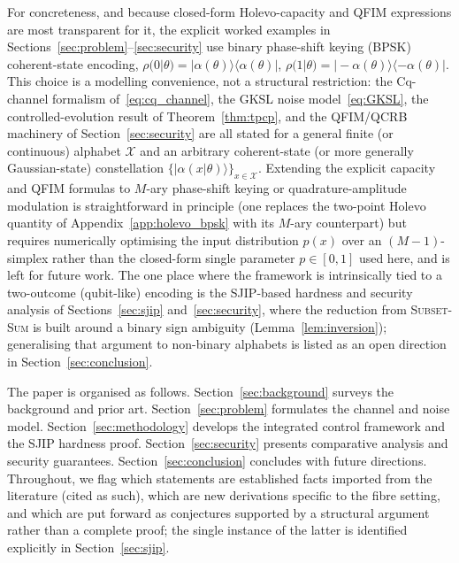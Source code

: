 \documentclass[journal,twocolumn]{IEEEtran}
\theoremstyle{definition}
\theoremstyle{plain}
\begin{document}
For concreteness, and because closed-form Holevo-capacity and QFIM
expressions are most transparent for it, the explicit worked
examples in Sections~\ref{sec:problem}--\ref{sec:security} use
binary phase-shift keying (BPSK) coherent-state encoding,
$\rho(0|\theta)=|\alpha(\theta)\rangle\langle\alpha(\theta)|$,
$\rho(1|\theta)=|-\alpha(\theta)\rangle\langle-\alpha(\theta)|$. This
choice is a modelling convenience, not a structural restriction: the
Cq-channel formalism of~\eqref{eq:cq_channel}, the GKSL noise
model~\eqref{eq:GKSL}, the controlled-evolution result of
Theorem~\ref{thm:tpcp}, and the QFIM/QCRB machinery of
Section~\ref{sec:security} are all stated for a general finite (or
continuous) alphabet $\mathcal{X}$ and an arbitrary coherent-state (or
more generally Gaussian-state) constellation $\{|\alpha(x|\theta)\rangle\}_{x\in\mathcal X}$.
Extending the explicit capacity and QFIM formulas to $M$-ary
phase-shift keying or quadrature-amplitude modulation is
straightforward in principle (one replaces the two-point Holevo
quantity of Appendix~\ref{app:holevo_bpsk} with its $M$-ary
counterpart) but requires numerically optimising the input
distribution $p(x)$ over an $(M-1)$-simplex rather than the closed-form
single parameter $p\in[0,1]$ used here, and is left for future work.
The one place where the framework is intrinsically tied to a
two-outcome (qubit-like) encoding is the SJIP-based hardness and
security analysis of Sections~\ref{sec:sjip} and~\ref{sec:security},
where the reduction from \textsc{Subset-Sum} is built around a
binary sign ambiguity (Lemma~\ref{lem:inversion}); generalising that
argument to non-binary alphabets is listed as an open direction in
Section~\ref{sec:conclusion}.

The paper is organised as follows.  Section~\ref{sec:background}
surveys the background and prior art.  Section~\ref{sec:problem}
formulates the channel and noise model.
Section~\ref{sec:methodology} develops the integrated control
framework and the SJIP hardness proof.
Section~\ref{sec:security} presents comparative analysis and
security guarantees.  Section~\ref{sec:conclusion} concludes with
future directions. Throughout, we flag which statements are
established facts imported from the literature (cited as such),
which are new derivations specific to the fibre setting, and which
are put forward as conjectures supported by a structural argument
rather than a complete proof; the single instance of the latter is
identified explicitly in Section~\ref{sec:sjip}.

\end{document}
